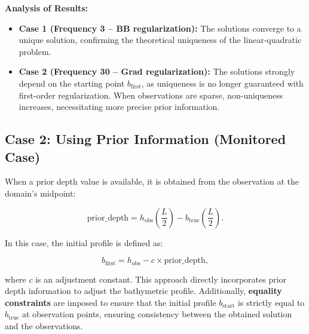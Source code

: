 \documentclass{article}
\begin{document}
\noindent\textbf{Analysis of Results:}

\begin{itemize}
    \item \textbf{Case 1 (Frequency 3 – BB regularization):}  
    The solutions converge to a unique solution, confirming the theoretical uniqueness of the linear-quadratic problem.

    \item \textbf{Case 2 (Frequency 30 – Grad regularization):}  
    The solutions strongly depend on the starting point \( b_{\text{first}} \), as uniqueness is no longer guaranteed with first-order regularization. When observations are sparse, non-uniqueness increases, necessitating more precise prior information.
\end{itemize}

\subsection{Case 2: Using Prior Information (Monitored Case)}

When a prior depth value is available, it is obtained from the observation at the domain's midpoint:

\[
\text{prior\_depth} = h_{\text{obs}}\left(\frac{L}{2}\right) - b_{\text{true}}\left(\frac{L}{2}\right).
\]

In this case, the initial profile is defined as:

\[
b_{\text{first}} = h_{\text{obs}} - c \times \text{prior\_depth},
\]

where \( c \) is an adjustment constant. This approach directly incorporates prior depth information to adjust the bathymetric profile. Additionally, \textbf{equality constraints} are imposed to ensure that the initial profile \( b_{\text{start}} \) is strictly equal to \( b_{\text{true}} \) at observation points, ensuring consistency between the obtained solution and the observations.
\end{document}
